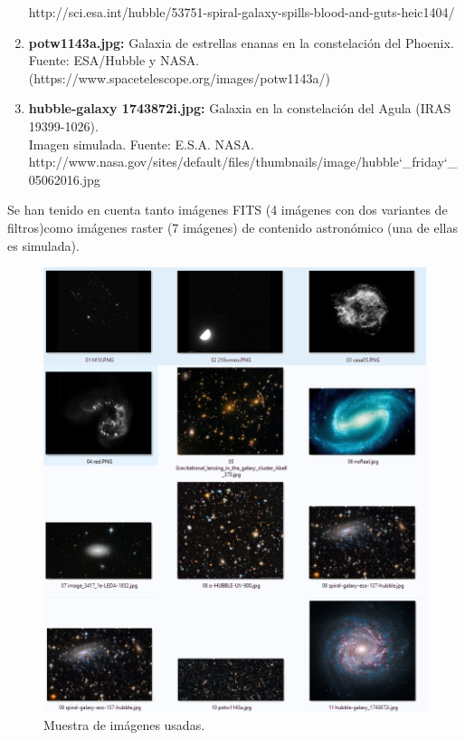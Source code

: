 \begin{enumerate}
		http://sci.esa.int/hubble/53751-spiral-galaxy-spills-blood-and-guts-heic1404/
		\item \textbf{potw1143a.jpg:} Galaxia de estrellas enanas en la constelación del Phoenix.\\
		Fuente:  ESA/Hubble y NASA. (https://www.spacetelescope.org/images/potw1143a/)
		\item \textbf{hubble-galaxy 1743872i.jpg:} Galaxia en la constelación del Agula (IRAS 19399-1026).\\ Imagen simulada.
		Fuente: E.S.A. NASA.\\ http://www.nasa.gov/sites/default/files/thumbnails/image/hubble\char`_friday\char`_05062016.jpg
	\end{enumerate}
	Se han tenido en cuenta tanto imágenes FITS (4 imágenes con dos variantes de filtros)como imágenes raster (7 imágenes) de contenido astronómico (una de ellas es simulada).\\

	\begin{figure}[!htb]
		\centering
		\includegraphics[width=1.2\textwidth]{images/imgFuentesSnap/compoFuentes.png}
		\caption{\label{fig:IntergalacticStar}{\small Muestra de imágenes usadas.}}
	\end{figure}
	\clearpage

